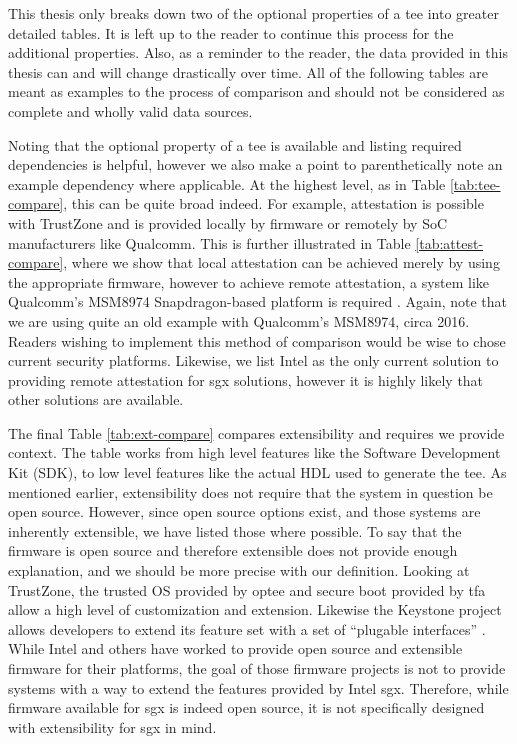 This thesis only breaks down two of the optional properties of a \gls{tee} into greater detailed tables. It is left up to the reader to continue this process for the additional properties. Also, as a reminder to the reader, the data provided in this thesis can and will change drastically over time. All of the following tables are meant as examples to the process of comparison and should not be considered as complete and wholly valid data sources.

Noting that the optional property of a \gls{tee} is available and listing required dependencies is helpful, however we also make a point to parenthetically note an example dependency where applicable. At the highest level, as in Table \ref{tab:tee-compare}, this can be quite broad indeed. For example, \gls{attestation} is possible with TrustZone and is provided locally by firmware or remotely by SoC manufacturers like Qualcomm. This is further illustrated in Table \ref{tab:attest-compare}, where we show that local \gls{attestation} can be achieved merely by using the appropriate firmware, however to achieve remote \gls{attestation}, a system like Qualcomm's MSM8974 Snapdragon-based platform is required \cite{spensky2016sok}. Again, note that we are using quite an old example with Qualcomm's MSM8974, circa 2016. Readers wishing to implement this method of comparison would be wise to chose current security platforms. Likewise, we list Intel as the only current solution to providing remote \gls{attestation} for \gls{sgx} solutions, however it is highly likely that other solutions are available.

The final Table \ref{tab:ext-compare} compares extensibility and requires we provide context. The table works from high level features like the Software Development Kit (SDK), to low level features like the actual HDL used to generate the \gls{tee}. As mentioned earlier, extensibility does not require that the system in question be open source. However, since open source options exist, and those systems are inherently extensible, we have listed those where possible. To say that the firmware is open source and therefore extensible does not provide enough explanation, and we should be more precise with our definition. Looking at TrustZone, the trusted OS provided by \gls{optee} and secure boot provided by \gls{tfa} allow a high level of customization and extension. Likewise the Keystone project allows developers to extend its feature set with a set of ``plugable interfaces'' \cite{lee2019keystone}. While Intel and others have worked to provide open source and extensible firmware for their platforms, the goal of those firmware projects is not to provide systems with a way to extend the features provided by Intel \gls{sgx}. Therefore, while firmware available for \gls{sgx} is indeed open source, it is not specifically designed with extensibility for \gls{sgx} in mind.

